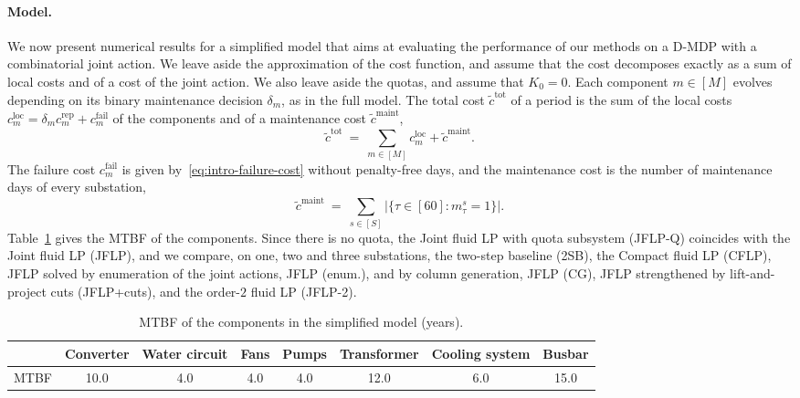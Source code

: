 \documentclass{article}
\begin{document}
\paragraph{Model.} We now present numerical results for a simplified model that aims at evaluating the performance of our methods on a D-MDP with a
combinatorial joint action. We leave aside the approximation of the cost function, and assume that the cost
decomposes exactly as a sum of local costs and of a cost of the joint action. We also leave aside the quotas, and
assume that $K_0 = 0$. Each component $m \in [M]$ evolves depending on its binary maintenance decision $\delta_m$, as
in the full model. The total cost $\tilde c^{\mathrm{tot}}$ of a period is the sum of the local costs
$c^{\mathrm{loc}}_m = \delta_m c^{\mathrm{rep}}_m + c^{\mathrm{fail}}_m$ of the components and of a maintenance cost
$\tilde c^{\mathrm{maint}}$,
\begin{equation}
\tilde c^{\mathrm{tot}} \ =\ \sum_{m \in [M]} c^{\mathrm{loc}}_m + \tilde c^{\mathrm{maint}}.
\end{equation}
The failure cost $c^{\mathrm{fail}}_m$ is given by~\eqref{eq:intro-failure-cost} without penalty-free days, and the
maintenance cost is the number of maintenance days of every substation,
\[
\tilde c^{\mathrm{maint}} \ =\ \sum_{s \in [S]} \big|\{\tau \in [60] : m^s_\tau = 1\}\big|.
\]
Table~\ref{tab:mtbf-simplified} gives the MTBF of the components. Since there is no quota, the Joint fluid LP with quota subsystem (JFLP-Q) coincides with the Joint fluid LP (JFLP), and
we compare, on one, two and three substations, the two-step baseline (2SB), the Compact fluid LP (CFLP), JFLP solved
by enumeration of the joint actions, JFLP (enum.), and by column generation, JFLP (CG), JFLP strengthened by
lift-and-project cuts (JFLP+cuts), and the order-$2$ fluid LP (JFLP-2).

\begin{table}[H]
\centering
\small
\begin{tabular}{lccccccc}
\toprule
 & Converter & Water circuit & Fans & Pumps & Transformer & Cooling system & Busbar \\
\midrule
MTBF & 10.0 & 4.0 & 4.0 & 4.0 & 12.0 & 6.0 & 15.0 \\
\bottomrule
\end{tabular}
\caption{MTBF of the components in the simplified model (years).}
\label{tab:mtbf-simplified}
\end{table}
\end{document}
